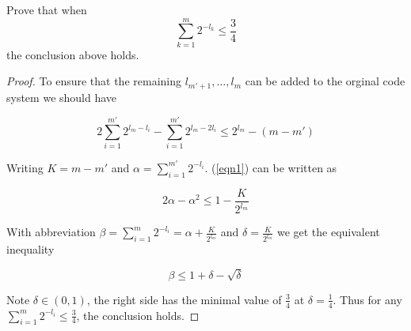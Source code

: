 \begin{exercise}{ Prove that when
  $$\sum_{k=1}^{m} 2^{-l_{k}} \leq \frac{3}{4}$$  the conclusion above holds.}
\begin{proof}
    To ensure that the remaining $l_{m'+1},\ldots,l_m$ can be added to the orginal code system we should have

    \begin{equation}
      2 \sum_{i=1}^{m'} 2^{l_m -l_i}- \sum_{i=1}^{m'}2^{l_m - 2l_i} \le 2^{l_m} - (m -m')
      \label{eqn1}
    \end{equation}

    Writing $K = m - m'$ and $\alpha = \sum_{i=1}^{m'} 2^{-l_i}$. (\ref{eqn1}) can be written as

    \begin{equation}
      2\alpha - \alpha^2 \le 1 - \frac{K}{2^{l_m}}
    \end{equation}

    With abbreviation $\beta = \sum_{i=1}^{m} 2^{-l_i} = \alpha + \frac{K}{2^{l_m}}$ and $\delta = \frac{K}{2^{l_m}}$ we get the equivalent inequality

    \begin{equation}
      \beta \le 1+\delta - \sqrt{\delta}
    \end{equation}

    Note $\delta \in (0,1)$, the right side has the minimal value of $\frac{3}{4}$ at $\delta = \frac{1}{4}$. Thus for any $ \sum_{i=1}^{m} 2^{-l_i} \le \frac{3}{4}$, the conclusion holds.

  \end{proof}
  \label{ex3}
\end{exercise}

